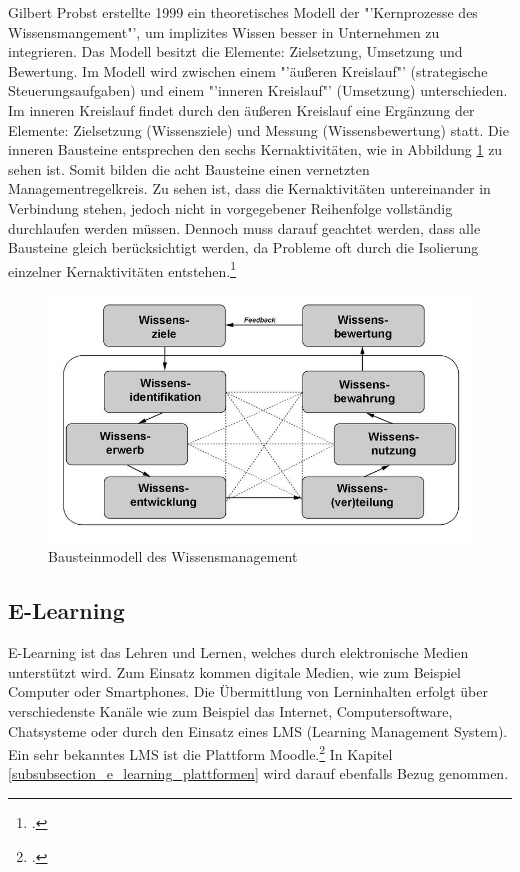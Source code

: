 Gilbert Probst erstellte 1999 ein theoretisches Modell der "'Kernprozesse des Wissensmangement"', um implizites 
Wissen besser in Unternehmen zu integrieren. Das Modell besitzt die Elemente: Zielsetzung, Umsetzung und 
Bewertung. Im Modell wird zwischen einem "'äußeren Kreislauf"' (strategische Steuerungsaufgaben) und einem 
"'inneren Kreislauf"' (Umsetzung) unterschieden. Im inneren Kreislauf findet durch den äußeren Kreislauf eine 
Ergänzung der Elemente: Zielsetzung (Wissensziele) und Messung (Wissensbewertung) statt. Die inneren Bausteine 
entsprechen den sechs Kernaktivitäten, wie in Abbildung \ref{fig_wissensmanagament_probst} zu sehen ist. Somit 
bilden die acht Bausteine einen vernetzten Managementregelkreis. Zu sehen ist, dass die Kernaktivitäten untereinander 
in Verbindung stehen, jedoch nicht in vorgegebener Reihenfolge vollständig durchlaufen werden müssen. Dennoch 
muss darauf geachtet werden, dass alle Bausteine gleich berücksichtigt werden, da Probleme oft durch die Isolierung 
einzelner Kernaktivitäten entstehen.\footcite[Vgl.][]{wissensmangement_enzyklopaedie-der-wirtschaftsinformatik.de_2012} 

\begin{figure}[h!]
	\centering
	\includegraphics[width=15cm]{kapitel/gruppe2/bilder/wissensmanagament_probst}
	\caption{Bausteinmodell des Wissensmanagement\protect\footnotemark}
	\label{fig_wissensmanagament_probst}
\end{figure}

\subsection{E-Learning}
\label{subsection_e-learning}
E-Learning ist das Lehren und Lernen, welches durch elektronische Medien unterstützt wird. Zum Einsatz kommen digitale Medien, wie zum Beispiel Computer oder Smartphones. Die Übermittlung von Lerninhalten erfolgt über verschiedenste Kanäle wie zum Beispiel das Internet, Computersoftware, Chatsysteme oder durch den Einsatz eines LMS (Learning Management System). Ein sehr bekanntes LMS ist die Plattform Moodle.\footcite[Vgl.][]{e-learning_team025.jimdo.com_2009} In Kapitel \ref{subsubsection_e_learning_plattformen} wird darauf ebenfalls Bezug genommen.


